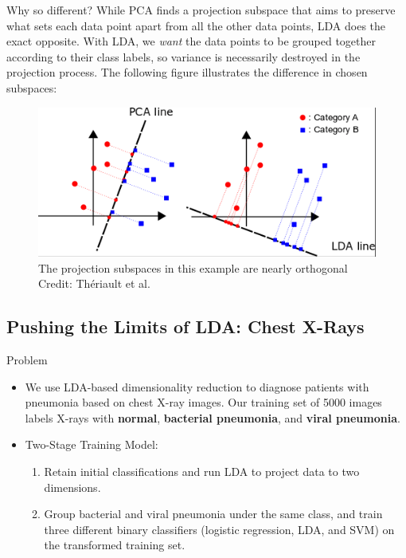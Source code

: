 \documentclass[9pt]{beamer}
\begin{document}
\begin{frame}{Why so different?}
    While PCA finds a projection subspace that aims to preserve what sets each data point apart from all the other data points, LDA does the exact opposite.
    With LDA, we \textit{want} the data points to be grouped together according to their class labels, so variance is necessarily destroyed in the projection process.
    The following figure illustrates the difference in chosen subspaces:
    \begin{figure}
        \centering
        \includegraphics[width=\textwidth]{pca_lda_projectionss.png}
        \footnotesize \caption{The projection subspaces in this example are nearly orthogonal\\
        \tiny Credit: Th\'eriault et al.}
        \label{fig:my_label}
    \end{figure}
\end{frame}

\subsection{Pushing the Limits of LDA: Chest X-Rays}

\frame{\subsectionpage}

\begin{frame}{Problem}
    \begin{itemize}
        \item We use LDA-based dimensionality reduction to diagnose patients with pneumonia based on chest X-ray images. Our training set of 5000 images labels X-rays with \textbf{normal}, \textbf{bacterial pneumonia}, and \textbf{viral pneumonia}.
        \item Two-Stage Training Model:
        \begin{enumerate}
            \item Retain initial classifications and run LDA to project data to two dimensions.
            \item Group bacterial and viral pneumonia under the same class, and train three different binary classifiers (logistic regression, LDA, and SVM) on the transformed training set. 
        \end{enumerate}
    \end{itemize}
\end{frame}
\end{document}
